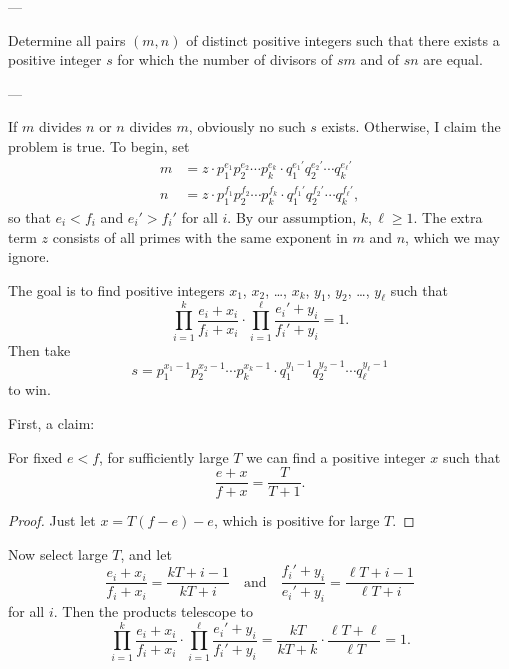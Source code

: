 
---

Determine all pairs $(m,n)$ of distinct positive integers such that there exists a positive integer $s$ for which the number of divisors of $sm$ and of $sn$ are equal.

---

If $m$ divides $n$ or $n$ divides $m$, obviously no such $s$ exists. Otherwise, I claim the problem is true. To begin, set
\begin{align*}
    m&=z\cdot p_1^{e_1}p_2^{e_2}\cdots p_k^{e_k}\cdot q_1^{e_1'}q_2^{e_2'}\cdots q_k^{e_\ell'}\\
    n&=z\cdot p_1^{f_1}p_2^{f_2}\cdots p_k^{f_k}\cdot q_1^{f_1'}q_2^{f_2'}\cdots q_k^{f_\ell'},
\end{align*}
so that $e_i<f_i$ and $e_i'>f_i'$ for all $i$. By our assumption, $k,\ell\ge1$. The extra term $z$ consists of all primes with the same exponent in $m$ and $n$, which we may ignore.

The goal is to find positive integers $x_1$, $x_2$, \ldots, $x_k$, $y_1$, $y_2$, \ldots, $y_\ell$ such that
\[\prod_{i=1}^k\frac{e_i+x_i}{f_i+x_i}\cdot\prod_{i=1}^\ell\frac{e_i'+y_i}{f_i'+y_i}=1.\]
Then take
\[s=p_1^{x_1-1}p_2^{x_2-1}\cdots p_k^{x_k-1}\cdot q_1^{y_1-1}q_2^{y_2-1}\cdots q_\ell^{y_\ell-1}\]
to win.

First, a claim:
\begin{claim*}
    For fixed $e<f$, for sufficiently large $T$ we can find a positive integer $x$ such that
    \[\frac{e+x}{f+x}=\frac T{T+1}.\]
\end{claim*}
\begin{proof}
    Just let $x=T(f-e)-e$, which is positive for large $T$.
\end{proof}

Now select large $T$, and let
\[\frac{e_i+x_i}{f_i+x_i}=\frac{kT+i-1}{kT+i}\quad\text{and}\quad\frac{f_i'+y_i}{e_i'+y_i}=\frac{\ell T+i-1}{\ell T+i}\]
for all $i$. Then the products telescope to
\[\prod_{i=1}^k\frac{e_i+x_i}{f_i+x_i}\cdot\prod_{i=1}^\ell\frac{e_i'+y_i}{f_i'+y_i}=\frac{kT}{kT+k}\cdot\frac{\ell T+\ell}{\ell T}=1.\]

